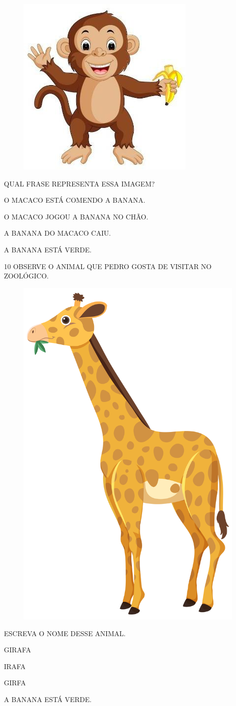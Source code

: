 \begin{figure}[htpb]
\centering
\includegraphics[width=.3\textwidth]{media/image218.jpg}
\end{figure}

QUAL FRASE REPRESENTA ESSA IMAGEM?

\begin{escolha}
\item O MACACO ESTÁ COMENDO A BANANA.

\item O MACACO JOGOU A BANANA NO CHÃO.

\item A BANANA DO MACACO CAIU.

\item A BANANA ESTÁ VERDE.
\end{escolha}

\pagebreak
\num{10} OBSERVE O ANIMAL QUE PEDRO GOSTA DE VISITAR NO ZOOLÓGICO.

\begin{figure}[htpb]
\centering
\includegraphics[width=.3\textwidth]{media/image219.jpg}
\end{figure}

ESCREVA O NOME DESSE ANIMAL.

\begin{escolha}
\item GIRAFA

\item IRAFA

\item GIRFA

\item A BANANA ESTÁ VERDE.
\end{escolha}

